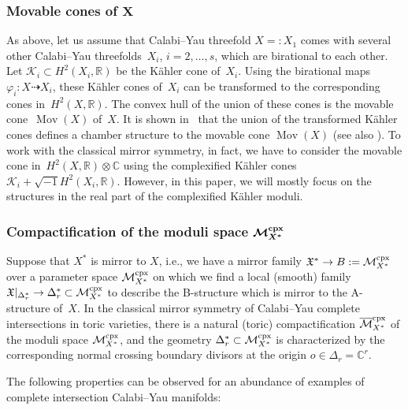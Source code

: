 \documentclass[10pt,a4paper]{amsart}
\numberwithin{equation}{section}
\begin{document}
\subsubsection[Movable cones of $X$]{Movable cones of $\boldsymbol{X}$} As above, let us assume that Calabi--Yau threefold $X=:X_{1}$ comes with several other Calabi--Yau threefolds~$X_{i}$, $i=2,\dots,s$, which are birational to each other. Let $\mathcal{K}_{i}\subset H^{2}(X_{i},\mathbb{R})$ be the K\"ahler cone of~$X_{i}$. Using the birational maps $\varphi_{i}\colon X\dashrightarrow X_{i}$, these K\"ahler cones of~$X_{i}$ can be transformed to the corresponding cones in~$H^{2}(X,\mathbb{R})$. The convex hull of the union of these cones is the movable cone~$\operatorname{Mov}(X)$ of~$X$. It is shown in~\cite{KawMovC} that the union of the transformed K\"ahler cones defines a chamber structure to the movable cone $\operatorname{Mov}(X)$ (see also \cite[Section~5]{MoKahler}). To work with the classical mirror symmetry, in fact, we have to consider the movable cone in~$H^{2}(X,\mathbb{R})\otimes\mathbb{C}$ using the complexified K\"ahler cones $\mathcal{K}_{i}+\sqrt{-1}H^{2}(X_{i},\mathbb{R})$. However, in this paper, we will mostly focus on the structures in the real part of the complexified K\"ahler moduli.

\subsubsection[Compactification of the moduli space ${\mathcal M}_{X^*}^{\rm cpx}$]{Compactification of the moduli space $\boldsymbol{{\mathcal M}_{X^*}^{\rm cpx}}$}\label{para:obs-path}

Suppose that $X^{*}$ is mirror to $X$, i.e., we have a mirror family $\mathfrak{X}^{*}\to B:=\mbox{\ensuremath{\mathcal{M}}}_{X^{*}}^{\rm cpx}$ over a parameter space $\mathcal{M}_{X^{*}}^{\rm cpx}$ on which we find a local (smooth) family $\mathfrak{X}|_{\Delta_{r}^{*}}\to\Delta_{r}^{*}\subset\mathcal{M}_{X^{*}}^{\rm cpx}$ to describe the B-structure which is mirror to the A-structure of~$X$. In the classical mirror symmetry of Calabi--Yau complete intersections in toric varieties, there is a natural (toric) compactification $\overline{\mathcal{M}}_{X^{*}}^{\rm cpx}$ \cite{hosCICY, HLY} of the moduli space $\mathcal{M}_{X^{*}}^{\rm cpx}$, and the geometry $\Delta_{r}^{*}\subset\mathcal{M}_{X^{*}}^{\rm cpx}$ is characterized by the corresponding normal crossing boundary divisors at the origin $o\in\Delta_{r}=\mathbb{C}^{r}$.

The following properties can be observed for an abundance of examples of complete intersection Calabi--Yau manifolds:
\end{document}
